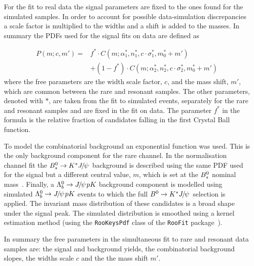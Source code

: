 For the fit to real data the signal parameters are fixed to the ones found for the simulated samples.
In order to account for possible data-simulation discrepancies a scale factor is multiplied to the widths
and a shift is added to the masses. In summary the PDFs used for the signal fits on data are defined as

\begin{equation}
\label{eq:DCB_RKst}
\begin{array} {ll}
P(m;c,m') = & f^{*} \cdot C(m;\alpha_1^{*},n_1^{*},c \cdot \sigma_1^{*}, m_0^{*} + m') \\
&+ (1 - f^{*}) \cdot C(m;\alpha_2^{*},n_2^{*},c \cdot \sigma_2^{*}, m_0^{*} + m')
\end{array}
\end{equation}  
\noindent
where the free parameters are the width scale factor, $c$, and the mass shift, $m'$, which are common between the rare
and resonant samples. The other parameters, denoted with $*$, are taken from the fit to simulated events, 
separately for the rare and resonant samples and are fixed in the fit on data.
The parameter $f^{*}$ in the formula is the relative fraction of candidates falling in the first Crystal Ball function.

To model the combinatorial background an exponential function was used.
This is the only background component for the rare channel.
In the normalisation channel fit the $\Bs  \to \Kstar\jpsi$ background
is described using the same PDF used for the signal but a different central value, $m$,
which is set at the ${{B}^0_{s}}$ nominal mass~\cite{PDG2014}.
Finally, a $\Lb\to\jpsi pK$ background component is modelled using simulated \mbox{$\Lb\to\jpsi pK$} events
to which the full $\Bz \to \Kstar\jpsi$ selection is applied. The invariant mass distribution
of these candidates is a broad shape under the signal peak. The simulated distribution 
is smoothed using a kernel estimation method (using the \verb!RooKeysPdf!  class of the \verb!RooFit! package~\cite{Verkerke:2003ir}).

In summary the free parameters in the simultaneous fit to rare and resonant \mumu data samples are:
the signal and background yields, the combinatorial background slopes, the widths scale $c$ and
the the mass shift $m'$.

